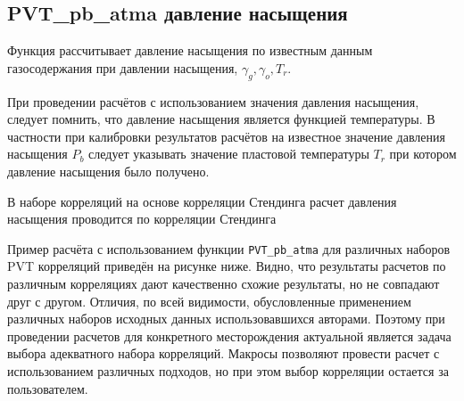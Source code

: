  

\subsection{PVT\_pb\_atma давление насыщения}
Функция рассчитывает давление насыщения по известным данным газосодержания при давлении насыщения, $\gamma_g, \gamma_o, T_r$.

При проведении расчётов с использованием значения давления насыщения, следует помнить, что давление насыщения является функцией температуры. В частности при калибровки результатов расчётов на известное значение давления насыщения $P_b$ следует указывать значение пластовой температуры $T_r$ при котором давление насыщения было получено. 

В наборе корреляций на основе корреляции Стендинга расчет давления насыщения проводится по корреляции Стендинга \cite{Yukos_PVT_2002}


Пример расчёта с использованием функции \texttt{PVT_pb_atma} для различных наборов PVT корреляций приведён на рисунке ниже. Видно, что результаты расчетов по различным корреляциях дают качественно схожие результаты, но не совпадают друг с другом.  Отличия, по всей видимости,  обусловленные применением различных наборов исходных данных использовавшихся авторами. Поэтому при проведении расчетов для конкретного месторождения актуальной является задача выбора адекватного набора корреляций. Макросы \unf{} позволяют провести расчет с использованием различных подходов, но при этом выбор корреляции остается за пользователем. 



